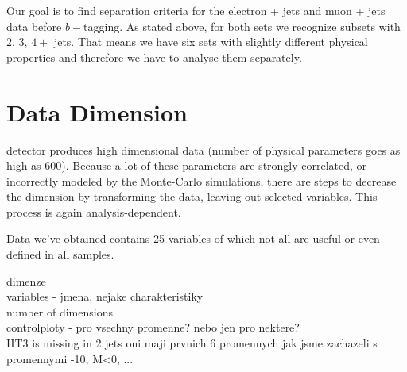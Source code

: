Our goal is to find separation criteria for the electron + jets and muon + jets data before $b-$tagging. As stated above, for both sets we recognize subsets with $2, \,3,\, 4+$ jets. That means we have six sets with slightly different physical properties and therefore we have to analyse them separately. 

\section{Data Dimension}
\dzero detector  produces high dimensional data (number of physical parameters  goes as high as $600$). Because a lot of these parameters are strongly correlated, or incorrectly modeled by the Monte-Carlo simulations, there are steps to decrease the dimension by transforming the data, leaving out selected variables. This process is again analysis-dependent.

Data we've obtained contains 25 variables of which not all are useful or even defined in all samples. 

dimenze \\
variables - jmena, nejake charakteristiky \\
number of dimensions \\
controlploty - pro vsechny promenne? nebo jen pro nektere?\\
HT3 is missing in 2 jets
oni maji prvnich 6 promennych
jak jsme zachazeli s promennymi -10, M<0, ...
